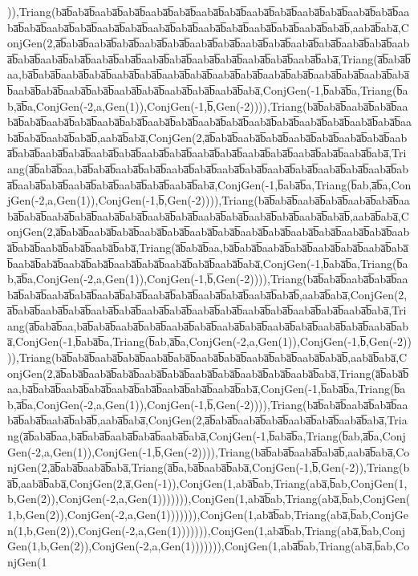 )),Triang(ba̅b̅aba̅b̅aaba̅b̅aba̅b̅aaba̅b̅aba̅b̅aaba̅b̅aba̅b̅aaba̅b̅aba̅b̅aaba̅b̅aba̅b̅aaba̅b̅aba̅b̅aaba̅b̅aba̅b̅aaba̅b̅aba̅b̅aaba̅b̅aba̅b̅aaba̅b̅aba̅b̅aaba̅b̅aba̅b̅aaba̅b̅aba̅b̅aaba̅b̅aba̅b̅,aaba̅b̅aba̅,ConjGen(2,a̅b̅aba̅b̅aaba̅b̅aba̅b̅aaba̅b̅aba̅b̅aaba̅b̅aba̅b̅aaba̅b̅aba̅b̅aaba̅b̅aba̅b̅aaba̅b̅aba̅b̅aaba̅b̅aba̅b̅aaba̅b̅aba̅b̅aaba̅b̅aba̅b̅aaba̅b̅aba̅b̅aaba̅b̅aba̅b̅aaba̅b̅aba̅b̅aaba̅b̅aba̅,Triang(a̅b̅aba̅b̅aa,ba̅b̅aba̅b̅aaba̅b̅aba̅b̅aaba̅b̅aba̅b̅aaba̅b̅aba̅b̅aaba̅b̅aba̅b̅aaba̅b̅aba̅b̅aaba̅b̅aba̅b̅aaba̅b̅aba̅b̅aaba̅b̅aba̅b̅aaba̅b̅aba̅b̅aaba̅b̅aba̅b̅aaba̅b̅aba̅b̅aaba̅b̅aba̅,ConjGen(-1,b̅aba̅b̅a,Triang(b̅ab,a̅b̅a,ConjGen(-2,a,Gen(1)),ConjGen(-1,b̅,Gen(-2)))),Triang(ba̅b̅aba̅b̅aaba̅b̅aba̅b̅aaba̅b̅aba̅b̅aaba̅b̅aba̅b̅aaba̅b̅aba̅b̅aaba̅b̅aba̅b̅aaba̅b̅aba̅b̅aaba̅b̅aba̅b̅aaba̅b̅aba̅b̅aaba̅b̅aba̅b̅aaba̅b̅aba̅b̅aaba̅b̅aba̅b̅,aaba̅b̅aba̅,ConjGen(2,a̅b̅aba̅b̅aaba̅b̅aba̅b̅aaba̅b̅aba̅b̅aaba̅b̅aba̅b̅aaba̅b̅aba̅b̅aaba̅b̅aba̅b̅aaba̅b̅aba̅b̅aaba̅b̅aba̅b̅aaba̅b̅aba̅b̅aaba̅b̅aba̅b̅aaba̅b̅aba̅b̅aaba̅b̅aba̅,Triang(a̅b̅aba̅b̅aa,ba̅b̅aba̅b̅aaba̅b̅aba̅b̅aaba̅b̅aba̅b̅aaba̅b̅aba̅b̅aaba̅b̅aba̅b̅aaba̅b̅aba̅b̅aaba̅b̅aba̅b̅aaba̅b̅aba̅b̅aaba̅b̅aba̅b̅aaba̅b̅aba̅b̅aaba̅b̅aba̅,ConjGen(-1,b̅aba̅b̅a,Triang(b̅ab,a̅b̅a,ConjGen(-2,a,Gen(1)),ConjGen(-1,b̅,Gen(-2)))),Triang(ba̅b̅aba̅b̅aaba̅b̅aba̅b̅aaba̅b̅aba̅b̅aaba̅b̅aba̅b̅aaba̅b̅aba̅b̅aaba̅b̅aba̅b̅aaba̅b̅aba̅b̅aaba̅b̅aba̅b̅aaba̅b̅aba̅b̅aaba̅b̅aba̅b̅,aaba̅b̅aba̅,ConjGen(2,a̅b̅aba̅b̅aaba̅b̅aba̅b̅aaba̅b̅aba̅b̅aaba̅b̅aba̅b̅aaba̅b̅aba̅b̅aaba̅b̅aba̅b̅aaba̅b̅aba̅b̅aaba̅b̅aba̅b̅aaba̅b̅aba̅b̅aaba̅b̅aba̅,Triang(a̅b̅aba̅b̅aa,ba̅b̅aba̅b̅aaba̅b̅aba̅b̅aaba̅b̅aba̅b̅aaba̅b̅aba̅b̅aaba̅b̅aba̅b̅aaba̅b̅aba̅b̅aaba̅b̅aba̅b̅aaba̅b̅aba̅b̅aaba̅b̅aba̅,ConjGen(-1,b̅aba̅b̅a,Triang(b̅ab,a̅b̅a,ConjGen(-2,a,Gen(1)),ConjGen(-1,b̅,Gen(-2)))),Triang(ba̅b̅aba̅b̅aaba̅b̅aba̅b̅aaba̅b̅aba̅b̅aaba̅b̅aba̅b̅aaba̅b̅aba̅b̅aaba̅b̅aba̅b̅aaba̅b̅aba̅b̅aaba̅b̅aba̅b̅,aaba̅b̅aba̅,ConjGen(2,a̅b̅aba̅b̅aaba̅b̅aba̅b̅aaba̅b̅aba̅b̅aaba̅b̅aba̅b̅aaba̅b̅aba̅b̅aaba̅b̅aba̅b̅aaba̅b̅aba̅b̅aaba̅b̅aba̅,Triang(a̅b̅aba̅b̅aa,ba̅b̅aba̅b̅aaba̅b̅aba̅b̅aaba̅b̅aba̅b̅aaba̅b̅aba̅b̅aaba̅b̅aba̅b̅aaba̅b̅aba̅b̅aaba̅b̅aba̅,ConjGen(-1,b̅aba̅b̅a,Triang(b̅ab,a̅b̅a,ConjGen(-2,a,Gen(1)),ConjGen(-1,b̅,Gen(-2)))),Triang(ba̅b̅aba̅b̅aaba̅b̅aba̅b̅aaba̅b̅aba̅b̅aaba̅b̅aba̅b̅aaba̅b̅aba̅b̅aaba̅b̅aba̅b̅,aaba̅b̅aba̅,ConjGen(2,a̅b̅aba̅b̅aaba̅b̅aba̅b̅aaba̅b̅aba̅b̅aaba̅b̅aba̅b̅aaba̅b̅aba̅b̅aaba̅b̅aba̅,Triang(a̅b̅aba̅b̅aa,ba̅b̅aba̅b̅aaba̅b̅aba̅b̅aaba̅b̅aba̅b̅aaba̅b̅aba̅b̅aaba̅b̅aba̅,ConjGen(-1,b̅aba̅b̅a,Triang(b̅ab,a̅b̅a,ConjGen(-2,a,Gen(1)),ConjGen(-1,b̅,Gen(-2)))),Triang(ba̅b̅aba̅b̅aaba̅b̅aba̅b̅aaba̅b̅aba̅b̅aaba̅b̅aba̅b̅,aaba̅b̅aba̅,ConjGen(2,a̅b̅aba̅b̅aaba̅b̅aba̅b̅aaba̅b̅aba̅b̅aaba̅b̅aba̅,Triang(a̅b̅aba̅b̅aa,ba̅b̅aba̅b̅aaba̅b̅aba̅b̅aaba̅b̅aba̅,ConjGen(-1,b̅aba̅b̅a,Triang(b̅ab,a̅b̅a,ConjGen(-2,a,Gen(1)),ConjGen(-1,b̅,Gen(-2)))),Triang(ba̅b̅aba̅b̅aaba̅b̅aba̅b̅,aaba̅b̅aba̅,ConjGen(2,a̅b̅aba̅b̅aaba̅b̅aba̅,Triang(a̅b̅a,ba̅b̅aaba̅b̅aba̅,ConjGen(-1,b̅,Gen(-2)),Triang(ba̅b̅,aaba̅b̅aba̅,ConjGen(2,a̅,Gen(-1)),ConjGen(1,aba̅b̅ab,Triang(aba̅,b̅ab,ConjGen(1,b,Gen(2)),ConjGen(-2,a,Gen(1))))))),ConjGen(1,aba̅b̅ab,Triang(aba̅,b̅ab,ConjGen(1,b,Gen(2)),ConjGen(-2,a,Gen(1))))))),ConjGen(1,aba̅b̅ab,Triang(aba̅,b̅ab,ConjGen(1,b,Gen(2)),ConjGen(-2,a,Gen(1))))))),ConjGen(1,aba̅b̅ab,Triang(aba̅,b̅ab,ConjGen(1,b,Gen(2)),ConjGen(-2,a,Gen(1))))))),ConjGen(1,aba̅b̅ab,Triang(aba̅,b̅ab,ConjGen(1